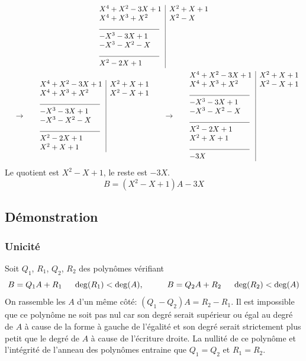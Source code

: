 \begin{multline*}
\begin{array}{l|l}
  X^4+X^2-3X+1    & X^2+X+1 \\
  X^4 + X^3 + X^2 & X^2 -X\\
  \line(1,0){80} & \\
  -X^3-3X+1       & \\
  -X^3-X^2-X      & \\
  \line(1,0){80} & \\
  X^2 -2X +1 &
 \end{array} \\
\hspace{0.5cm} \rightarrow \hspace{0.5cm} 
 \begin{array}{l|l}
  X^4+X^2-3X+1    & X^2+X+1 \\
  X^4 + X^3 + X^2 & X^2 -X+1\\
  \line(1,0){80} & \\
  -X^3-3X+1       & \\
  -X^3-X^2-X      & \\
  \line(1,0){80} & \\
  X^2 -2X +1 & \\
  X^2+X +1
 \end{array}
\hspace{0.5cm} \rightarrow \hspace{0.5cm} 
 \begin{array}{l|l}
  X^4+X^2-3X+1    & X^2+X+1 \\
  X^4 + X^3 + X^2 & X^2 -X+1\\
  \line(1,0){80} & \\
  -X^3-3X+1       & \\
  -X^3-X^2-X      & \\
  \line(1,0){80} & \\
  X^2 -2X +1 & \\
  X^2+X +1 &\\
  \line(1,0){80} & \\
  -3X
 \end{array}
\end{multline*}
Le quotient est $X^2-X+1$, le reste est $-3X$.
\[
 B = (X^2 - X + 1)A -3X
\]

\subsection{Démonstration}
\subsubsection{Unicité} Soit $Q_1$, $R_1$, $Q_2$, $R_2$ des polynômes vérifiant
\begin{displaymath}
 B = Q_1 A+R_1\hspace{0.5cm}\deg(R_1)<\deg(A),\hspace{1cm}B = Q_2 A+R_2\hspace{0.5cm}\deg(R_2)<\deg(A)
\end{displaymath}
On rassemble les $A$ d'un même côté: $(Q_1-Q_2)A=R_2-R_1$. Il est impossible que ce polynôme ne soit pas nul car son degré serait supérieur ou égal au degré de $A$ à cause de la forme à gauche de l'égalité et son degré serait strictement plus petit que le degré de $A$ à cause de l'écriture droite. La nullité de ce polynôme et l'intégrité de l'anneau des polynômes entraine que $Q_1=Q_2$ et $R_1=R_2$.
